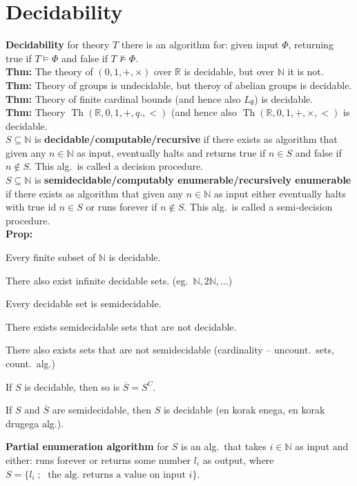 \documentclass[a4paper,oneside,12pt]{article}
\theoremstyle{definition}
\newcommand{\R}{\ensuremath{\mathbb{R}}}
\newcommand{\N}{\ensuremath{\mathbb{N}}}
\newenvironment{enumerate*}{\vspace{-1.8\parskip}\begin{enumerate}\setlength{\itemsep}{0pt}\setlength{\parskip}{2pt}}{\end{enumerate}\vspace{-1\parskip}}
\DeclareMathOperator{\Th}{Th}
\begin{document}
\section*{Decidability}
\textbf{Decidability} for theory $T$ there is an algorithm for: given input $\Phi$, returning true if $T \models \Phi$ and false if $T \nvDash \Phi$.\\
\textbf{Thm: }The theory of $(0, 1, +, \times)$ over $\R$ is decidable, but over $\N$ it is not.\\
\textbf{Thm: }Theory of groups is undecidable, but theroy of abelian groups is decidable.\\
\textbf{Thm: }Theory of finite cardinal bounds (and hence also $L_{\emptyset}$) is decidable.\\
\textbf{Thm: }Theory $\Th(\R, 0, 1, +, q., <)$ (and hence also $\Th(\R, 0, 1, +, \times, <)$  is decidable.\\
$S \subseteq \N$ is \textbf{decidable/computable/recursive} if there exists as algorithm that given any $n \in \N$ as input, eventually halts and returns true if $n \in S$ and false if $n \notin S$. This alg.\ is called a decision procedure.\\
$S \subseteq \N$ is \textbf{semidecidable/computably enumerable/recursively enumerable} if there exists as algorithm that given any $n \in \N$ as input either eventually halts with true id $n \in S$ or runs forever if $n \notin S$. This alg.\ is called a semi-decision procedure.\\
\textbf{Prop: }
\begin{enumerate*}
    \item Every finite subset of $\N$ is decidable.
    \item There also exist infinite decidable sets. (eg.\ $\N, 2 \N, \ldots$)
    \item Every decidable set is semidecidable.
    \item There exists semidecidable sets that are not decidable.
    \item There also exists sets that are not semidecidable (cardinality -- uncount.\ sets, count.\ alg.)
    \item If $S$ is decidable, then so is $\overline{S} = S^C$.
    \item If $S$ and $\overline{S}$ are semidecidable, then $S$ is decidable (en korak enega, en korak drugega alg.).
\end{enumerate*}
\textbf{Partial enumeration algorithm} for $S$ is an alg.\ that takes $i \in \N$ as input and either: runs forever or returns some number $l_i$ as output, where $S = \{ l_i \; ; \; \text{ the alg.\ returns a value on input }i \}.$\\
\end{document}
